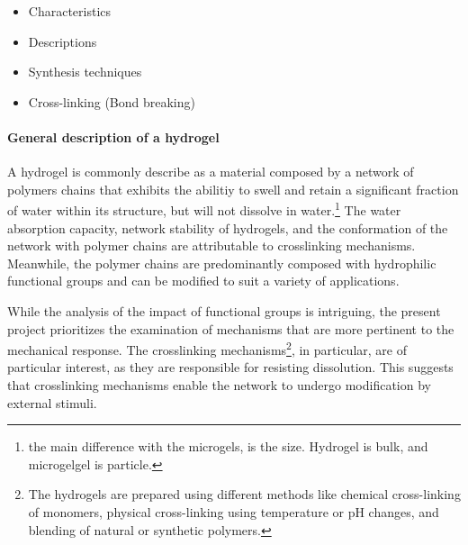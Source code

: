\begin{itemize}
    \item Characteristics
    \item Descriptions 
    \item Synthesis techniques
    \item Cross-linking (Bond breaking)
\end{itemize}

\paragraph{General description of a hydrogel}
A hydrogel is commonly describe as a material composed by a network of polymers chains that exhibits the abilitiy to swell and retain a significant fraction of water within its structure, but will not dissolve in water\citep{ahmedHydrogelPreparationCharacterization2015a,ahmedHydrogelsMicrogelsDriving2025,priyaComprehensiveReviewHydrogel2024,bustamante-torresHydrogelsClassificationAccording2021}.\footnote{the main difference with the microgels, is the size. Hydrogel is bulk, and microgelgel is particle.}
The water absorption capacity, network stability of hydrogels, and the conformation of the network with polymer chains are attributable to crosslinking mechanisms\citep{priyaComprehensiveReviewHydrogel2024,ahmedHydrogelPreparationCharacterization2015a}.
Meanwhile, the polymer chains are predominantly composed with hydrophilic functional groups and can be modified to suit a variety of applications\citep{ahmedHydrogelPreparationCharacterization2015a,priyaComprehensiveReviewHydrogel2024,bustamante-torresHydrogelsClassificationAccording2021}.


While the analysis of the impact of functional groups is intriguing, the present project prioritizes the examination of mechanisms that are more pertinent to the mechanical response. 
The crosslinking mechanisms\footnote{The hydrogels are prepared using different methods like chemical cross-linking of monomers, physical cross-linking using temperature or pH changes, and blending of natural or synthetic polymers.}, in particular, are of particular interest, as they are responsible for resisting dissolution. 
This suggests that crosslinking mechanisms enable the network to undergo modification by external stimuli.

